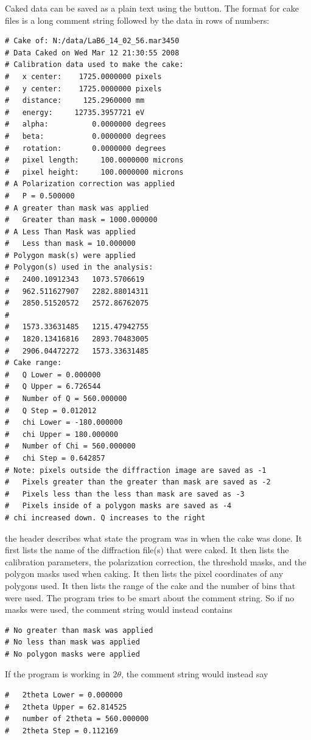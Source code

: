 Caked data can be saved as a plain text 
using the  button. The format for cake files is 
a long comment string followed by the data in rows of numbers:
\begin{lstlisting}
# Cake of: N:/data/LaB6_14_02_56.mar3450 
# Data Caked on Wed Mar 12 21:30:55 2008
# Calibration data used to make the cake:
#   x center:    1725.0000000 pixels
#   y center:    1725.0000000 pixels
#   distance:     125.2960000 mm
#   energy:     12735.3957721 eV
#   alpha:          0.0000000 degrees
#   beta:           0.0000000 degrees
#   rotation:       0.0000000 degrees
#   pixel length:     100.0000000 microns
#   pixel height:     100.0000000 microns
# A Polarization correction was applied
#   P = 0.500000
# A greater than mask was applied
#   Greater than mask = 1000.000000
# A Less Than Mask was applied
#   Less than mask = 10.000000
# Polygon mask(s) were applied
# Polygon(s) used in the analysis:
#   2400.10912343	1073.5706619
#   962.511627907	2282.88014311
#   2850.51520572	2572.86762075
#
#   1573.33631485	1215.47942755
#   1820.13416816	2893.70483005
#   2906.04472272	1573.33631485
# Cake range:
#   Q Lower = 0.000000
#   Q Upper = 6.726544
#   Number of Q = 560.000000
#   Q Step = 0.012012
#   chi Lower = -180.000000
#   chi Upper = 180.000000
#   Number of Chi = 560.000000
#   chi Step = 0.642857
# Note: pixels outside the diffraction image are saved as -1
#   Pixels greater than the greater than mask are saved as -2
#   Pixels less than the less than mask are saved as -3
#   Pixels inside of a polygon masks are saved as -4
# chi increased down. Q increases to the right
\end{lstlisting}
the header describes what state the program was in when the 
cake was done. It first lists the name of the diffraction 
file(s) that were caked. It then lists the calibration parameters, 
the polarization correction, the threshold masks, and the polygon masks 
used when caking. It then lists the pixel 
coordinates of any polygons used.  It then lists 
the range of the cake and the number of bins that were used.
The program tries to be smart about the comment string. So if
no masks were used, the comment string would instead contains 
\begin{lstlisting}
# No greater than mask was applied
# No less than mask was applied
# No polygon masks were applied
\end{lstlisting}
If the program is working in $2\theta$, the comment string would
instead say 
\begin{lstlisting}
#   2theta Lower = 0.000000
#   2theta Upper = 62.814525
#   number of 2theta = 560.000000
#   2theta Step = 0.112169
\end{lstlisting}

